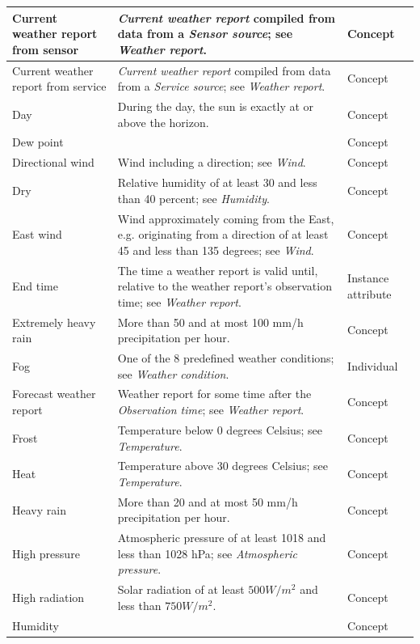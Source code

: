 \begin{longtable}{|p{}|p{}|p{}|}
  \hline
  Current weather report from sensor & \emph{Current weather report} compiled from data from a \emph{Sensor source}; see \emph{Weather report}. & Concept \\
  \hline
  Current weather report from service & \emph{Current weather report} compiled from data from a \emph{Service source}; see \emph{Weather report}. & Concept \\
  \hline
  Day & During the day, the sun is exactly at or above the horizon. & Concept \\
  \hline
  Dew point & & Concept \\ %
  \hline
  Directional wind & Wind including a direction; see \emph{Wind}. & Concept \\
  \hline
  Dry & Relative humidity of at least 30 and less than 40 percent; see \emph{Humidity}. & Concept \\
  \hline
  East wind & Wind approximately coming from the East, e.g. originating from a direction of at least 45 and less than 135 degrees; see \emph{Wind}. & Concept \\
  \hline
  End time & The time a weather report is valid until, relative to the weather report's observation time; see \emph{Weather report}. & Instance attribute \\
  \hline
  Extremely heavy rain & More than 50 and at most 100 mm/h precipitation per hour. & Concept \\
  \hline
  Fog & One of the 8 predefined weather conditions; see \emph{Weather condition}. & Individual \\
  \hline
  Forecast weather report & Weather report for some time after the \emph{Observation time}; see \emph{Weather report}. & Concept \\
  \hline
  Frost & Temperature below 0 degrees Celsius; see \emph{Temperature}. & Concept \\
  \hline
  Heat & Temperature above 30 degrees Celsius; see \emph{Temperature}. & Concept \\
  \hline
  Heavy rain & More than 20 and at most 50 mm/h precipitation per hour. & Concept \\
  \hline
  High pressure & Atmospheric pressure of at least 1018 and less than 1028 hPa; see \emph{Atmospheric pressure}. & Concept \\
  \hline
  High radiation & Solar radiation of at least $500 W/m^2$ and less than $750 W/m^2$. & Concept \\
  \hline
  Humidity & & Concept \\ %
  \hline

\end{longtable}
